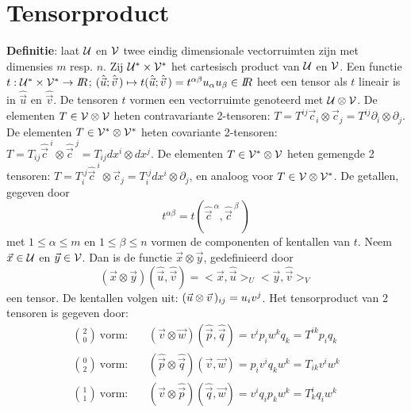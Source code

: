 \section{Tensorproduct}
{\bf Definitie}: laat $\cal U$ en $\cal V$ twee eindig dimensionale vectorruimten
zijn met dimensies $m$ resp. $n$. Zij $\cal U^*\times V^*$ het cartesisch
product van $\cal U$ en $\cal V$. Een functie $t:{\cal U^*\times V^*}\rightarrow I\hspace{-1mm}R$;
$(\hat{\vec{u}};\hat{\vec{v}}\,)\mapsto t(\hat{\vec{u}};\hat{\vec{v}}\,)=t^{\alpha\beta}u_\alpha u_\beta\in I\hspace{-1mm}R$
heet een tensor als $t$ lineair is in $\hat{\vec{u}}$ en $\hat{\vec{v}}$.
De tensoren $t$ vormen een vectorruimte genoteerd met $\cal U\otimes V$.
De elementen $T\in\cal V\otimes V$ heten contravariante 2-tensoren:
$T=T^{ij}\vec{c}_i\otimes\vec{c}_j=T^{ij}\partial_i\otimes\partial_j$. De
elementen $T\in\cal V^*\otimes V^*$ heten covariante 2-tensoren:
$T=T_{ij}\hat{\vec{c}}^{~i}\otimes\hat{\vec{c}}^{~j}=T_{ij}dx^i\otimes dx^j$.
De elementen $T\in\cal V^*\otimes V$ heten gemengde 2 tensoren:
$T=T_i^{.j}\hat{\vec{c}}^{~i}\otimes\vec{c}_j=T_i^{.j}dx^i\otimes\partial_j$,
en analoog voor $T\in\cal V\otimes V^*$.
\npar
De getallen, gegeven door
\[
t^{\alpha\beta}=t(\hat{\vec{c}}^{~\alpha},\hat{\vec{c}}^{~\beta}\,)
\]
met $1\leq\alpha\leq m$ en $1\leq\beta\leq n$ vormen de componenten of
kentallen van $t$.
\npar
Neem $\vec{x}\in\cal U$ en $\vec{y}\in\cal V$. Dan is de functie
$\vec{x}\otimes\vec{y}$, gedefinieerd door
\[
(\vec{x}\otimes\vec{y})(\hat{\vec{u}},\hat{\vec{v}})=<\vec{x},\hat{\vec{u}}>_U<\vec{y},\hat{\vec{v}}>_V
\]
een tensor. De kentallen volgen uit: $(\vec{u}\otimes\vec{v}\,)_{ij}=u_iv^j$.
Het tensorproduct van 2 tensoren is gegeven door:
\begin{eqnarray*}
{2\choose0}~\mbox{vorm:}~&&(\vec{v}\otimes\vec{w})(\hat{\vec{p}},\hat{\vec{q}})=v^ip_iw^kq_k=T^{ik}p_iq_k\\
{0\choose2}~\mbox{vorm:}~&&(\hat{\vec{p}}\otimes\hat{\vec{q}})(\vec{v},\vec{w})=p_iv^iq_kw^k=T_{ik}v^iw^k\\
{1\choose1}~\mbox{vorm:}~&&(\vec{v}\otimes\hat{\vec{p}})(\hat{\vec{q}},\vec{w})=v^iq_ip_kw^k=T_k^iq_iw^k
\end{eqnarray*}

